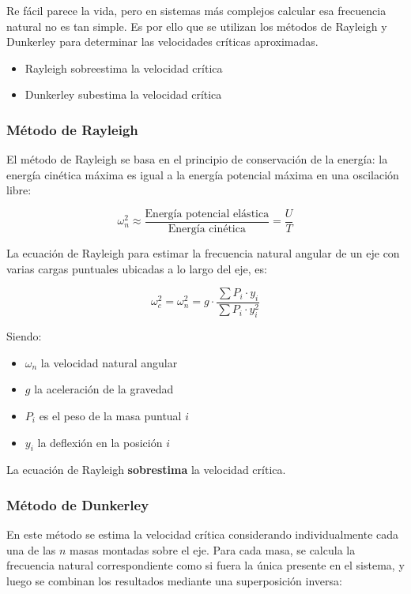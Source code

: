 \documentclass[spanish,11pt,a4paper]{article}
\begin{document}
	Re fácil parece la vida, pero en sistemas más complejos calcular esa frecuencia natural no es tan simple. Es por ello que se utilizan los métodos de Rayleigh y Dunkerley para determinar las velocidades críticas aproximadas.
	\begin{itemize}
		\item Rayleigh sobreestima la velocidad crítica
		\item Dunkerley subestima la velocidad crítica
	\end{itemize}
	
	\subsubsection{Método de Rayleigh}
	
	El método de Rayleigh se basa en el principio de conservación de la energía: la energía cinética máxima es igual a la energía potencial máxima en una oscilación libre:
	
	\begin{equation*}
		\omega_n^2 \approx \dfrac{\text{Energía potencial elástica}}{\text{Energía cinética}} = \dfrac{U}{T}
	\end{equation*}
	
	La ecuación de Rayleigh para estimar la frecuencia natural angular de un eje con varias cargas puntuales ubicadas a lo largo del eje, es:
	\begin{tcolorbox}\begin{equation*}
			\omega_c^2 = \omega_n^2 = g \cdot \dfrac{\sum P_i \cdot y_i}{\sum P_i \cdot y_i^2}
		\end{equation*}
	\end{tcolorbox}
	Siendo:
	\begin{itemize}
		\item $\omega_n$ la velocidad natural angular
		\item $g$ la aceleración de la gravedad
		\item $P_i$ es el peso de la masa puntual $i$
		\item $y_i$ la deflexión en la posición $i$
	\end{itemize}
	
	La ecuación de Rayleigh \textbf{sobrestima} la velocidad crítica.
	
	
	
	\subsubsection{Método de Dunkerley}
	En este método se estima la velocidad crítica considerando individualmente cada una de las $n$ masas montadas sobre el eje. Para cada masa, se calcula la frecuencia natural correspondiente como si fuera la única presente en el sistema, y luego se combinan los resultados mediante una superposición inversa:
	 
\end{document}
